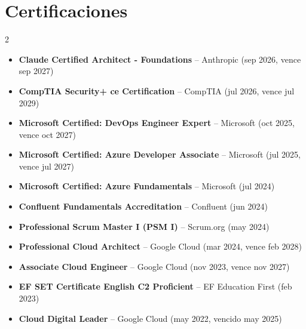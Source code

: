 \documentclass[10pt, a4paper]{article}
\begin{document}
\section{Certificaciones}
\begin{multicols}{2}
\begin{itemize}[leftmargin=10pt, itemsep=3pt, parsep=0pt, topsep=2pt]
    \item \textbf{Claude Certified Architect - Foundations} -- Anthropic (sep 2026, vence sep 2027)
    \item \textbf{CompTIA Security+ ce Certification} -- CompTIA (jul 2026, vence jul 2029)
    \item \textbf{Microsoft Certified: DevOps Engineer Expert} -- Microsoft (oct 2025, vence oct 2027)
    \item \textbf{Microsoft Certified: Azure Developer Associate} -- Microsoft (jul 2025, vence jul 2027)
    \item \textbf{Microsoft Certified: Azure Fundamentals} -- Microsoft (jul 2024)
    \item \textbf{Confluent Fundamentals Accreditation} -- Confluent (jun 2024)
    \item \textbf{Professional Scrum Master I (PSM I)} -- Scrum.org (may 2024)
    \item \textbf{Professional Cloud Architect} -- Google Cloud (mar 2024, vence feb 2028)
    \item \textbf{Associate Cloud Engineer} -- Google Cloud (nov 2023, vence nov 2027)
    \item \textbf{EF SET Certificate English C2 Proficient} -- EF Education First (feb 2023)
    \item \textbf{Cloud Digital Leader} -- Google Cloud (may 2022, vencido may 2025)
\end{itemize}
\end{multicols}

\end{document}
